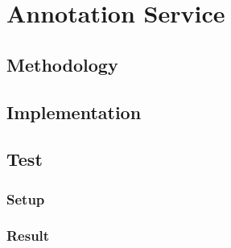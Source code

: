 \chapter{Annotation Service}

\section{Methodology}
\section{Implementation}
\section{Test}
\subsection{Setup}
\subsection{Result}